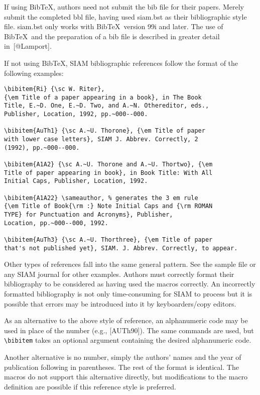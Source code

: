 \documentclass[]{article}
\begin{document}
If using {Bib}TeX, authors need not submit the {bib} file for their
papers. Merely submit the completed {bbl} file, having used {siam.bst}
as their bibliographic style file. {siam.bst} only works with
BibTeX~version 99i and later. The use of BibTeX~and the preparation of a
{bib} file is described in greater detail in~{[}@Lamport{]}.

If not using BibTeX, SIAM bibliographic references follow the format of
the following examples:

\begin{verbatim}
\bibitem{Ri} {\sc W. Riter},
{\em Title of a paper appearing in a book}, in The Book 
Title, E.~D. One, E.~D. Two, and A.~N. Othereditor, eds., 
Publisher, Location, 1992, pp.~000--000.

\bibitem{AuTh1} {\sc A.~U. Thorone}, {\em Title of paper
with lower case letters}, SIAM J. Abbrev. Correctly, 2
(1992), pp.~000--000.

\bibitem{A1A2} {\sc A.~U. Thorone and A.~U. Thortwo}, {\em
Title of paper appearing in book}, in Book Title: With All
Initial Caps, Publisher, Location, 1992.

\bibitem{A1A22} \sameauthor, % generates the 3 em rule
{\em Title of Book{\rm :} Note Initial Caps and {\rm ROMAN
TYPE} for Punctuation and Acronyms}, Publisher,
Location, pp.~000--000, 1992.

\bibitem{AuTh3} {\sc A.~U. Thorthree}, {\em Title of paper
that's not published yet}, SIAM. J. Abbrev. Correctly, to appear.
\end{verbatim}

Other types of references fall into the same general pattern. See the
sample file or any SIAM journal for other examples. Authors must
correctly format their bibliography to be considered as having used the
macros correctly. An incorrectly formatted bibliography is not only
time-consuming for SIAM to process but it is possible that errors may be
introduced into it by keyboarders/copy editors.

As an alternative to the above style of reference, an alphanumeric code
may be used in place of the number (e.g., {[}AUTh90{]}). The same
commands are used, but \texttt{\textbackslash{}bibitem} takes an
optional argument containing the desired alphanumeric code.

Another alternative is no number, simply the authors' names and the year
of publication following in parentheses. The rest of the format is
identical. The macros do not support this alternative directly, but
modifications to the macro definition are possible if this reference
style is preferred.
\end{document}

